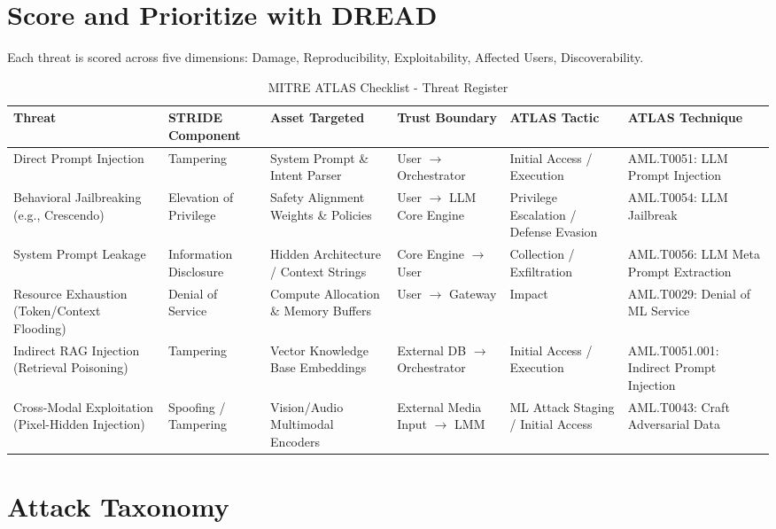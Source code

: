 \documentclass[a4paper,12pt]{report}
\begin{document}
\section{Score and Prioritize with DREAD}
Each threat is scored across five dimensions: Damage, Reproducibility, Exploitability, Affected Users, Discoverability.
\begin{table}[ht]
\centering
\scriptsize
\renewcommand{\arraystretch}{1.15}
\caption{MITRE ATLAS Checklist - Threat Register}
\label{tab:mitre_atlas_threat_register}
\begin{tabularx}{\textwidth}{|X|X|X|X|X|X|}
\hline
\textbf{Threat} &
\textbf{STRIDE Component} &
\textbf{Asset Targeted} &
\textbf{Trust Boundary} &
\textbf{ATLAS Tactic} &
\textbf{ATLAS Technique} \\
\hline
Direct Prompt Injection &
Tampering &
System Prompt \& Intent Parser &
User $\to$ Orchestrator &
Initial Access / Execution &
AML.T0051: LLM Prompt Injection \\
\hline
Behavioral Jailbreaking \newline (e.g., Crescendo) &
Elevation of Privilege &
Safety Alignment Weights \& Policies &
User $\to$ LLM Core Engine &
Privilege Escalation / Defense Evasion &
AML.T0054: LLM Jailbreak \\
\hline
System Prompt Leakage &
Information Disclosure &
Hidden Architecture / Context Strings &
Core Engine $\to$ User &
Collection / Exfiltration &
AML.T0056: LLM Meta Prompt Extraction \\
\hline
Resource Exhaustion \newline (Token/Context Flooding) &
Denial of Service &
Compute Allocation \& Memory Buffers &
User $\to$ Gateway &
Impact &
AML.T0029: Denial of ML Service \\
\hline
Indirect RAG Injection \newline (Retrieval Poisoning) &
Tampering &
Vector Knowledge Base Embeddings &
External DB $\to$ Orchestrator &
Initial Access / Execution &
AML.T0051.001: Indirect Prompt Injection \\
\hline
Cross-Modal Exploitation \newline (Pixel-Hidden Injection) &
Spoofing / Tampering &
Vision/Audio Multimodal Encoders &
External Media Input $\to$ LMM &
ML Attack Staging / Initial Access &
AML.T0043: Craft Adversarial Data \\
\hline
\end{tabularx}
\end{table}
\FloatBarrier

\section{Attack Taxonomy}
\end{document}
